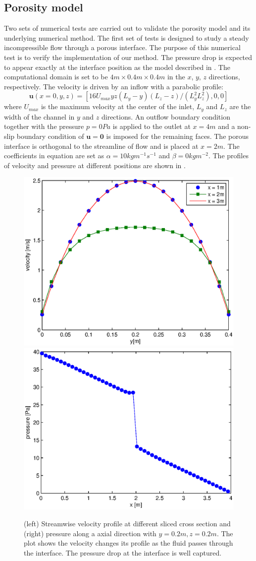 \subsection{Porosity model}
Two sets of numerical tests are carried out to validate the porosity model 
and its underlying numerical method. 
The first set of tests is designed to study a steady incompressible flow
through a porous interface. The purpose of this numerical test is to 
verify the implementation of our method. The pressure drop is expected to appear exactly 
at the interface position as the model described in . 
The computational domain is set to be $4 m\times
0.4 m\times 0.4 m$ in the $x$, $y$, $z$ directions, respectively. The velocity is
driven by an inflow with a parabolic profile: 
\begin{equation}
\mathbf{u}(x=0,y,z) = [16U_{max}yz(L_y - y)(L_z - z)/(L^2_yL^2_z),0,0]
\end{equation} 
where $U_{max}$ is the maximum velocity at the center of the
inlet, $L_y$ and $L_z$ are the width of the channel in $y$ and $z$ directions. 
An outflow boundary condition together with the pressure $p = 0 Pa$ is applied to 
the outlet at $x = 4 m$ and a non-slip boundary condition of $\mathbf{u} = \mathbf{0}$ 
is imposed for the remaining faces. The porous interface is orthogonal to the streamline 
of flow and is placed at $x = 2m$. The coefficients in equation  are set as 
$\alpha = 10 kgm^{-1}s^{-1}$ and $\beta = 0 kgm^{-2}$.
The profiles of velocity and pressure at different positions are shown in .  	

\begin{figure}[h] \centering
\includegraphics[width=0.49\columnwidth]{Figures/ucrs_profile}
\includegraphics[width=0.49\columnwidth]{Figures/p_profile} \caption{(left)
Streamwise velocity profile at different sliced cross section and 
(right) pressure along a axial direction with $y = 0.2 m, z = 0.2 m$. The plot 
shows the velocity changes its profile as the fluid passes through the interface. 
The pressure drop at the interface is well captured.} 
\label{fig:test1_profile} 
\end{figure}

